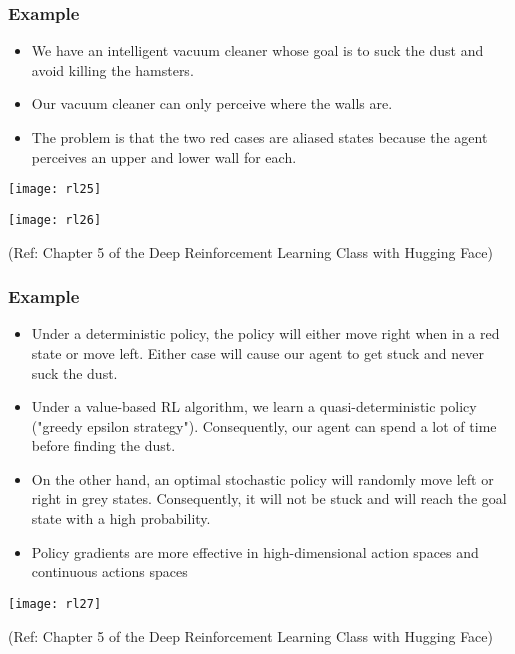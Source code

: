 \begin{frame}[fragile]\frametitle{Example  }

\begin{itemize}
\item We have an intelligent vacuum cleaner whose goal is to suck the dust and avoid killing the hamsters.
\item Our vacuum cleaner can only perceive where the walls are.
\item The problem is that the two red cases are aliased states because the agent perceives an upper and lower wall for each.
\end{itemize}

\begin{center}
\texttt{[image: rl25]}

\texttt{[image: rl26]}

\end{center}

{\tiny (Ref: Chapter 5 of the Deep Reinforcement Learning Class with Hugging Face)}

\end{frame}


\begin{frame}[fragile]\frametitle{Example  }

\begin{itemize}
\item Under a deterministic policy, the policy will either move right when in a red state or move left. Either case will cause our agent to get stuck and never suck the dust.

\item Under a value-based RL algorithm, we learn a quasi-deterministic policy ("greedy epsilon strategy"). Consequently, our agent can spend a lot of time before finding the dust.

\item On the other hand, an optimal stochastic policy will randomly move left or right in grey states. Consequently, it will not be stuck and will reach the goal state with a high probability.

\item Policy gradients are more effective in high-dimensional action spaces and continuous actions spaces
\end{itemize}

\begin{center}
\texttt{[image: rl27]}
\end{center}

{\tiny (Ref: Chapter 5 of the Deep Reinforcement Learning Class with Hugging Face)}

\end{frame}

